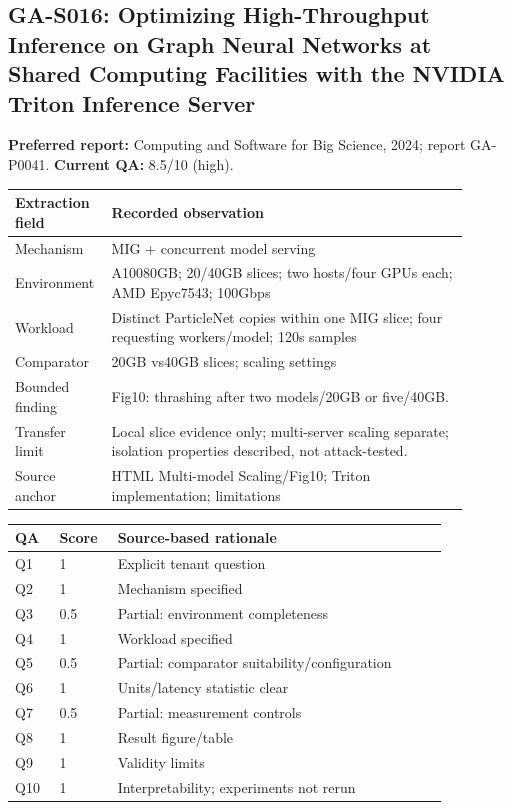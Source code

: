 \subsection{GA-S016: Optimizing High-Throughput Inference on Graph Neural Networks at Shared Computing Facilities with the NVIDIA Triton Inference Server}
\textbf{Preferred report:} Computing and Software for Big Science, 2024; report GA-P0041. \textbf{Current QA:} 8.5/10 (high).
\begin{longtable}{P{0.15\linewidth}P{0.75\linewidth}}
\toprule Extraction field & Recorded observation\\\midrule\endhead
Mechanism & MIG + concurrent model serving\\
Environment & A10080GB; 20/40GB slices; two hosts/four GPUs each; AMD Epyc7543; 100Gbps\\
Workload & Distinct ParticleNet copies within one MIG slice; four requesting workers/model; 120s samples\\
Comparator & 20GB vs40GB slices; scaling settings\\
Bounded finding & Fig10: thrashing after two models/20GB or five/40GB.\\
Transfer limit & Local slice evidence only; multi-server scaling separate; isolation properties described, not attack-tested.\\
Source anchor & HTML Multi-model Scaling/Fig10; Triton implementation; limitations\\
\bottomrule\end{longtable}
\begin{longtable}{P{0.09\linewidth}P{0.10\linewidth}P{0.67\linewidth}}
\toprule QA & Score & Source-based rationale\\\midrule\endhead
Q1 & 1 & Explicit tenant question\\
Q2 & 1 & Mechanism specified\\
Q3 & 0.5 & Partial: environment completeness\\
Q4 & 1 & Workload specified\\
Q5 & 0.5 & Partial: comparator suitability/configuration\\
Q6 & 1 & Units/latency statistic clear\\
Q7 & 0.5 & Partial: measurement controls\\
Q8 & 1 & Result figure/table\\
Q9 & 1 & Validity limits\\
Q10 & 1 & Interpretability; experiments not rerun\\
\bottomrule\end{longtable}

